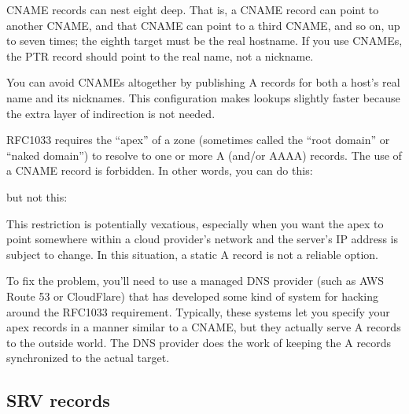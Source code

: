 CNAME records can nest eight deep. That is, a CNAME record can point to
another CNAME, and that CNAME can point to a third CNAME, and so on, up
to seven times; the eighth target must be the real hostname. If you use
CNAMEs, the PTR record should point to the real name, not a nickname.

You can avoid CNAMEs altogether by publishing A records for both a
host's real name and its nicknames. This configuration makes lookups
slightly faster because the extra layer of indirection is not needed.

\protect\hypertarget{part0024_split_028.htmlux5cux23_idIndexMarker2099}{}{}\protect\hypertarget{part0024_split_028.htmlux5cux23_idIndexMarker2100}{}{}RFC1033
requires the ``apex'' of a zone (sometimes called the ``root domain'' or
``naked domain'') to resolve to one or more A (and/or AAAA) records. The
use of a CNAME record is forbidden. In other words, you can do this:


but not this:


This restriction is potentially vexatious, especially when you want the
apex to point somewhere within a cloud provider's network and the
server's IP address is subject to change. In this situation, a static A
record is not a reliable option.

To fix the problem, you'll need to use a managed DNS provider (such as
AWS Route 53 or CloudFlare) that has developed some kind of system for
hacking around the RFC1033 requirement. Typically, these systems let you
specify your apex records in a manner similar to a CNAME, but they
actually serve A records to the outside world. The DNS provider does the
work of keeping the A records synchronized to the actual target.

\protect\hypertarget{part0024_split_029.html}{}{}

\hypertarget{part0024_split_029.htmlux5cux23_idContainer1069}{}
\hypertarget{part0024_split_029.htmlux5cux23calibre_pb_28}{%
\subsection[SRV
records]{\texorpdfstring{\protect\hypertarget{part0024_split_029.htmlux5cux23_idTextAnchor886}{}{}\protect\hypertarget{part0024_split_029.htmlux5cux23_idIndexMarker2101}{}{}\protect\hypertarget{part0024_split_029.htmlux5cux23_idIndexMarker2102}{}{}\protect\hypertarget{part0024_split_029.htmlux5cux23_idTextAnchor887}{}{}SRV
records}{SRV records}}\label{part0024_split_029.htmlux5cux23calibre_pb_28}}


